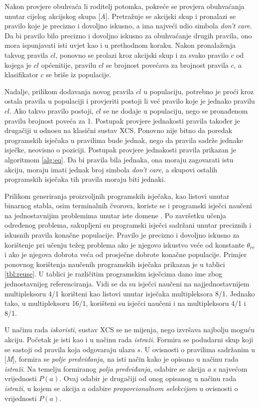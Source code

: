 \documentclass[times, utf8, zavrsni]{fer}
\begin{document}
Nakon provjere obuhvaća li roditelj potomka, pokreće se provjera obuhvaćanja unutar cijelog akcijskog skupa [\emph{A}].
Pretražuje se akcijski skup i pronalazi se pravilo koje je precizno i dovoljno iskusno, a ima najveći udio simbola \emph{don't care}.
Da bi pravilo bilo precizno i dovoljno iskusno za obuhvaćanje drugih pravila, ono mora ispunjavati isti uvjet kao i u prethodnom koraku.
Nakon pronalaženja takvog pravila $cl$, ponovno se prolazi kroz akcijski skup i za svako pravilo $c$ od kojega je $cl$ općenitije, pravilu $cl$ se brojnost povećava za brojnost pravila $c$, a klasifikator $c$ se briše iz populacije.

Nadalje, prilikom dodavanja novog pravila $cl$ u populaciju, potrebno je proći kroz ostala pravila u populaciji i provjeriti postoji li već pravilo koje je jednako pravilu $cl$.
Ako takvo pravilo postoji, $cl$ se ne dodaje u populaciju, nego se pronađenom pravilu brojnost poveća za 1.
Postupak provjere jednakosti pravila također je drugačiji u odnosu na klasični sustav XCS.
Ponovno nije bitno da poredak programskih isječaka u pravilima bude jednak, nego da pravila sadrže jednake isječke, neovisno o poziciji.
Postupak provjere jednakosti pravila prikazan je algoritmom \ref{alg:eq}.
Da bi pravila bila jednaka, ona moraju zagovarati istu akciju, moraju imati jednak broj simbola \emph{don't care}, a skupovi ostalih programskih isječaka tih pravila moraju biti jednaki.

Prilikom generiranja proizvoljnih programskih isječaka, kao listovi unutar binarnog stabla, osim terminalnih čvorova, koriste se i programski isječci naučeni na jednostavnijim problemima unutar iste domene \citep{4}.
Po završetku učenja određenog problema, sakupljeni su programski isječci sadržani unutar preciznih i iskusnih pravila konačne populacije.
Pravilo je precizno i dovoljno iskusno za korištenje pri učenju težeg problema ako je njegovo iskustvo veće od konstante $\theta_{re}$ i ako je njegova dobrota veća od prosječne dobrote konačne populacije.
Primjer ponovnog korištenja naučenih programskih isječaka prikazan je u tablici \ref{tbl:reuse}.
U tablici je različitim programskim isječcima dano ime zbog jednostavnijeg referenciranja.
Vidi se da su isječci naučeni na najjednostavnijem multipleksoru 4/1 korišteni kao listovi unutar isječaka multipleksora 8/1.
Jednako tako, u multipleksoru 16/1, korišteni su isječci naučeni i na multipleksoru 4/1 i 8/1.

U načinu rada \emph{iskoristi}, sustav XCS se ne mijenja, nego izvršava najbolju moguću akciju.
Početak je isti kao i u načinu rada \emph{istraži}.
Formira se podudarni skup koji se sastoji od pravila koja odgovaraju ulazu $s$.
U ovisnosti o pravilima sadržanim u [\emph{M}], formira se \emph{polje predviđanja}, na isti način kako je opisano u načinu rada \emph{istraži}.
Na temelju formiranog \emph{polja predviđanja}, odabire se akcija $a$ s najvećom vrijednosti $P(a)$.
Ovaj odabir je drugačiji od onog opisanog u načinu rada \emph{istraži}, u kojem se akcija $a$ odabire \emph{proporcionalnom selekcijom} u ovisnosti o vrijednosti $P(a)$.
\end{document}
